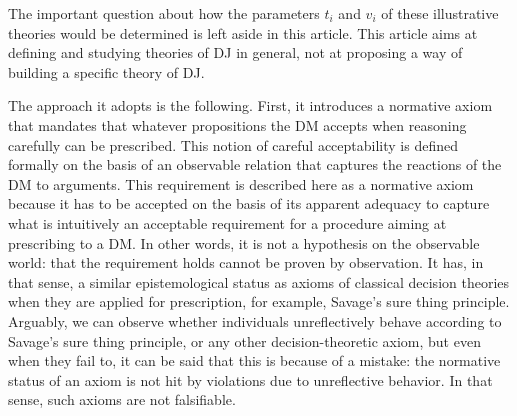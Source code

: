 \documentclass[version=last, pagesize, twoside=off, bibliography=totoc, DIV=calc, fontsize=12pt, a4paper, french, english]{scrartcl}
\begin{document}
The important question about how the parameters $t_i$ and $v_i$ of these illustrative theories would be determined is left aside in this article. This article aims at defining and studying theories of \ac{DJ} in general, not at proposing a way of building a specific theory of \ac{DJ}. %

The approach it adopts is the following.
First, it introduces a normative axiom that mandates that whatever propositions the \ac{DM} accepts when reasoning carefully can be prescribed. This notion of careful acceptability is defined formally on the basis of an observable relation that captures the reactions of the \ac{DM} to arguments.
This requirement is described here as a normative axiom because it has to be accepted on the basis of its apparent adequacy to capture what is intuitively an acceptable requirement for a procedure aiming at prescribing to a \ac{DM}. In other words, it is not a hypothesis on the observable world: that the requirement holds cannot be proven by observation. It has, in that sense, a similar epistemological status as axioms of classical decision theories when they are applied for prescription, for example, Savage’s sure thing principle. Arguably, we can observe whether individuals unreflectively behave according to Savage’s sure thing principle, or any other decision-theoretic axiom, but even when they fail to, it can be said that this is because of a mistake: the normative status of an axiom is not hit by violations due to unreflective behavior. In that sense, such axioms are not falsifiable.
\end{document}
